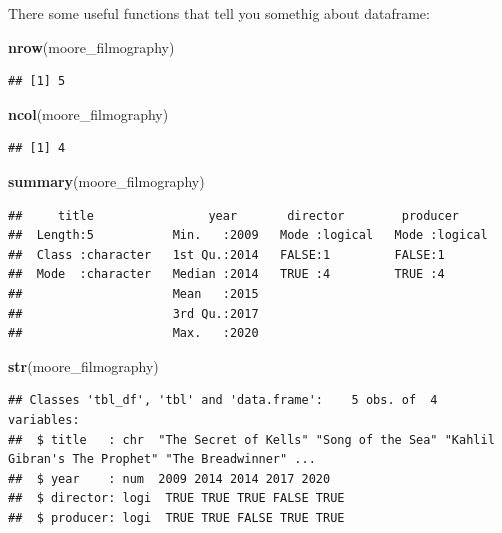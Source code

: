 \documentclass[
]{book}
\newenvironment{Shaded}{\begin{snugshade}}{\end{snugshade}}
\newcommand{\KeywordTok}[1]{\textcolor[rgb]{0.13,0.29,0.53}{\textbf{#1}}}
\newcommand{\NormalTok}[1]{#1}
\begin{document}
There some useful functions that tell you somethig about dataframe:

\begin{Shaded}
\begin{Highlighting}[]
\KeywordTok{nrow}\NormalTok{(moore_filmography)}
\end{Highlighting}
\end{Shaded}

\begin{verbatim}
## [1] 5
\end{verbatim}

\begin{Shaded}
\begin{Highlighting}[]
\KeywordTok{ncol}\NormalTok{(moore_filmography)}
\end{Highlighting}
\end{Shaded}

\begin{verbatim}
## [1] 4
\end{verbatim}

\begin{Shaded}
\begin{Highlighting}[]
\KeywordTok{summary}\NormalTok{(moore_filmography)}
\end{Highlighting}
\end{Shaded}

\begin{verbatim}
##     title                year       director        producer      
##  Length:5           Min.   :2009   Mode :logical   Mode :logical  
##  Class :character   1st Qu.:2014   FALSE:1         FALSE:1        
##  Mode  :character   Median :2014   TRUE :4         TRUE :4        
##                     Mean   :2015                                  
##                     3rd Qu.:2017                                  
##                     Max.   :2020
\end{verbatim}

\begin{Shaded}
\begin{Highlighting}[]
\KeywordTok{str}\NormalTok{(moore_filmography)}
\end{Highlighting}
\end{Shaded}

\begin{verbatim}
## Classes 'tbl_df', 'tbl' and 'data.frame':    5 obs. of  4 variables:
##  $ title   : chr  "The Secret of Kells" "Song of the Sea" "Kahlil Gibran's The Prophet" "The Breadwinner" ...
##  $ year    : num  2009 2014 2014 2017 2020
##  $ director: logi  TRUE TRUE TRUE FALSE TRUE
##  $ producer: logi  TRUE TRUE FALSE TRUE TRUE
\end{verbatim}
\end{document}
